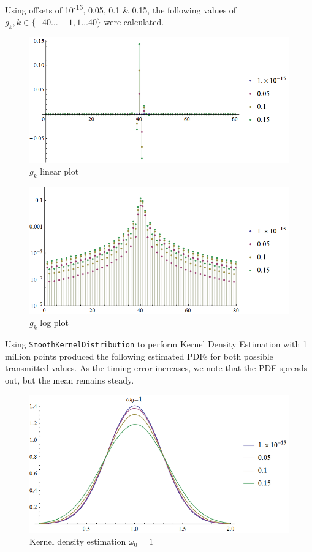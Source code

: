 Using offsets of 10\textsuperscript{-15}, 0.05, 0.1 \& 0.15, the
following values of $g_k, k \in \{ -40 \dots -1, 1 \dots 40 \}$ were
calculated.

\begin{figure}[htbp]
\centering
\includegraphics[width=\linewidth]{../../../plots/fyp1_w1_gklin.png}
\caption{$g_k$ linear plot}
\end{figure}

\begin{figure}[htbp]
\centering
\includegraphics[width=\linewidth]{../../../plots/fyp1_w1_gklog.png}
\caption{$g_k$ log plot}
\end{figure}

Using \texttt{SmoothKernelDistribution} to perform Kernel Density
Estimation with 1 million points produced the following estimated PDFs
for both possible transmitted values. As the timing error increases, we
note that the PDF spreads out, but the mean remains steady.

\begin{figure}[htbp]
\centering
\includegraphics[width=\linewidth]{../../../plots/fyp1_w1_kde.png}
\caption{Kernel density estimation $\omega_0=1$}
\end{figure}

